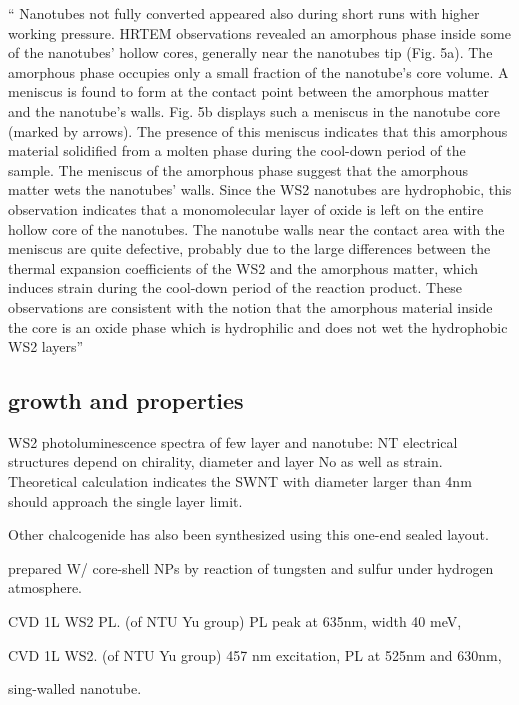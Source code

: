 `` Nanotubes not fully converted appeared also during short
runs with higher working pressure. HRTEM observations
revealed an amorphous phase inside some of the nanotubes’
hollow cores, generally near the nanotubes tip (Fig. 5a). The
amorphous phase occupies only a small fraction of the nanotube’s
core volume. A meniscus is found to form at the contact
point between the amorphous matter and the nanotube’s walls.
Fig. 5b displays such a meniscus in the nanotube core (marked
by arrows). The presence of this meniscus indicates that this
amorphous material solidified from a molten phase during the
cool-down period of the sample. The meniscus of the amorphous
phase suggest that the amorphous matter wets the
nanotubes’ walls. Since the WS2 nanotubes are hydrophobic,
this observation indicates that a monomolecular layer of oxide
is left on the entire hollow core of the nanotubes. The nanotube
walls near the contact area with the meniscus are quite defective,
probably due to the large differences between the thermal
expansion coefficients of the WS2 and the amorphous matter,
which induces strain during the cool-down period of the
reaction product. These observations are consistent with the
notion that the amorphous material inside the core is an oxide
phase which is hydrophilic and does not wet the hydrophobic
WS2 layers''\cite{Margolin2004}

\subsection{growth and properties}

WS2 photoluminescence spectra of few layer and nanotube:
NT electrical structures depend on chirality, diameter and layer No as well as strain. Theoretical calculation indicates the SWNT with diameter larger than 4nm should approach the single layer limit.\cite{Ghorbani-Asl2013}

Other chalcogenide has also been synthesized using this one-end sealed layout.\cite{Mukherjee2013}

\citeauthor{Zou2007} prepared W/ core-shell NPs by reaction of tungsten and sulfur under hydrogen atmosphere.\cite{Zou2007}

CVD 1L WS2 PL.\cite{Peimyoo2013} (of NTU Yu group) PL peak at 635nm, width 40 meV, 

CVD 1L WS2.\cite{Cong2013} (of NTU Yu group) 457 nm excitation, PL at 525nm and 630nm, 

 sing-walled nanotube.\cite{Xiao2014}

